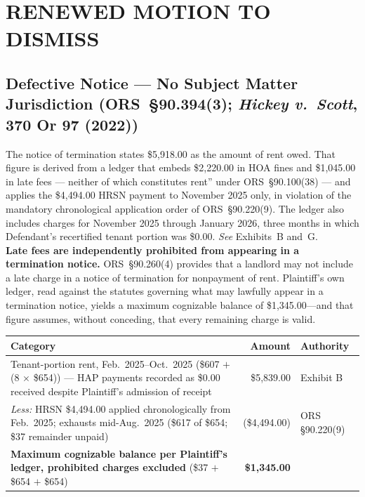 \documentclass[10pt,letterpaper,oneside]{extarticle}
\begin{document}
\section{\textbf{RENEWED MOTION TO DISMISS}}
\subsection{\textbf{Defective Notice --- No Subject Matter
		Jurisdiction
		(ORS~\S90.394(3); \textit{Hickey v.\ Scott},
		370 Or 97 (2022))}}
The notice of termination states \$5,918.00 as the amount
of rent owed. That figure is derived from a ledger that
embeds \$2,220.00 in HOA fines and \$1,045.00 in late fees
--- neither of which constitutes rent'' under
ORS~\S90.100(38) --- and applies the \$4,494.00 HRSN
payment to November 2025 only, in violation of the mandatory
chronological application order of ORS~\S90.220(9). The
ledger also includes charges for November 2025 through
January 2026, three months in which Defendant's recertified
tenant portion was \$0.00. \textit{See} Exhibits~B and~G.\\
\indent \textbf{Late fees are independently prohibited from
	appearing in a termination notice.} ORS~\S90.260(4)
provides that a landlord may not include a late charge in a
notice of termination for nonpayment of rent. \indent Plaintiff's own ledger, read against the statutes
governing what may lawfully appear in a termination notice,
yields a maximum cognizable balance of \$1,345.00---and
that figure assumes, without conceding, that every
remaining charge is valid.

\begin{center}
	\small
	\begin{tabular}{@{}p{4.2in}rp{1.3in}@{}}
		\toprule
		\textbf{Category} & \textbf{Amount} &
		\textbf{Authority} \\
		\midrule
		Tenant-portion rent, Feb.~2025--Oct.~2025
		(\$607 $+$ (8 $\times$ \$654))
		--- HAP payments recorded as \$0.00
		received despite Plaintiff's admission
		of receipt
		& \$5,839.00 & Exhibit B \\[4pt]
		\textit{Less:} HRSN \$4,494.00 applied
		chronologically from Feb.~2025;
		exhausts mid-Aug.~2025
		(\$617 of \$654; \$37 remainder unpaid)
		& (\$4,494.00) & ORS \S90.220(9) \\[4pt]
		\midrule
		\textbf{Maximum cognizable balance per
			Plaintiff's ledger, prohibited charges
			excluded} (\$37 $+$ \$654 $+$ \$654)
		& \textbf{\$1,345.00} & \\
		\bottomrule
	\end{tabular}
\end{center}
\end{document}
